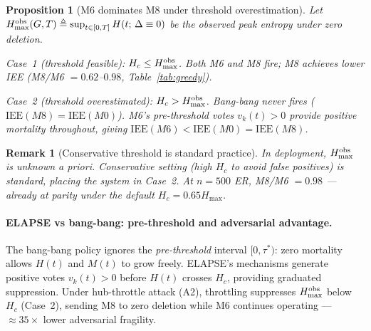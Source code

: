 \documentclass[review,12pt]{elsarticle}
\newcommand{\IEE}{\mathrm{IEE}}
\newcommand{\Hc}{H_c}
\newcommand{\Hmax}{H_{\max}}
\newtheorem{proposition}{Proposition}
\newtheorem{remark}{Remark}
\begin{document}
\begin{proposition}[M6 dominates M8 under threshold overestimation]
\label{prop:hc_dominance}
Let $\Hmax^{\rm obs}(G,T) \triangleq \sup_{t \in [0,T]} H(t;\,\Delta \equiv 0)$
be the observed peak entropy under zero deletion.

\emph{Case~1 (threshold feasible):} $\Hc \leq \Hmax^{\rm obs}$.  Both M6 and M8
fire; M8 achieves lower IEE (M8/M6 $= 0.62$--$0.98$, Table~\ref{tab:greedy}).

\emph{Case~2 (threshold overestimated):} $\Hc > \Hmax^{\rm obs}$.  Bang-bang
never fires ($\IEE(M8) = \IEE(M0)$).  M6's pre-threshold votes $v_k(t)>0$
provide positive mortality throughout, giving $\IEE(M6) < \IEE(M0) = \IEE(M8)$.
\end{proposition}

\begin{remark}[Conservative threshold is standard practice]
In deployment, $\Hmax^{\rm obs}$ is unknown a priori.  Conservative setting
(high $\Hc$ to avoid false positives) is standard, placing the system in
Case~2.  At $n=500$ ER, M8/M6 $= 0.98$ --- already at parity under the
default $\Hc = 0.65\Hmax$.
\end{remark}

\paragraph{ELAPSE vs bang-bang: pre-threshold and adversarial advantage.}
The bang-bang policy ignores the \emph{pre-threshold} interval $[0, \tau^*)$:
zero mortality allows $H(t)$ and $M(t)$ to grow freely.  ELAPSE's mechanisms
generate positive votes $v_k(t)>0$ before $H(t)$ crosses $\Hc$, providing
graduated suppression.  Under hub-throttle attack (A2), throttling suppresses
$H_{\max}^{\rm obs}$ below $\Hc$ (Case~2), sending M8 to zero deletion
while M6 continues operating --- $\approx 35\times$ lower adversarial fragility.
\end{document}
